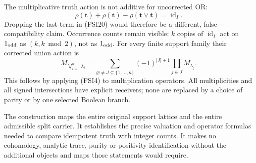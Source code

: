 The multiplicative truth action is not additive for uncorrected OR:
\begin{equation}\tag{FSI21}
\rho(\mathbf t)+\rho(\mathbf t)-\rho(\mathbf t\vee\mathbf t)
=\operatorname{id}_I .
\end{equation}
Dropping the last term in (FSI20) would therefore be a different,
false compatibility claim. Occurrence counts remain visible:
\(k\) copies of \(\operatorname{id}_I\) act on \(1_{\rm odd}\)
as \((k,k\bmod2)\), not as \(1_{\rm odd}\).
For every finite support family their corrected union action is
\begin{equation}\tag{FSI22}
M_{\bigvee_{i=1}^n\lambda_i}
=\sum_{\varnothing\ne J\subseteq\{1,\ldots,n\}}
(-1)^{|J|+1}\prod_{j\in J}M_{\lambda_j}.
\end{equation}
This follows by applying (FSI4) to multiplication operators.
All multiplicities and all signed intersections have explicit
receivers; none are replaced by a choice of parity or by one
selected Boolean branch.

The construction maps the entire original support lattice and the
entire admissible split carrier. It establishes the precise valuation
and operator formulas needed to compare idempotent truth with integer
counts. It makes no cohomology, analytic trace, purity or positivity
identification without the additional objects and maps those statements
would require.

